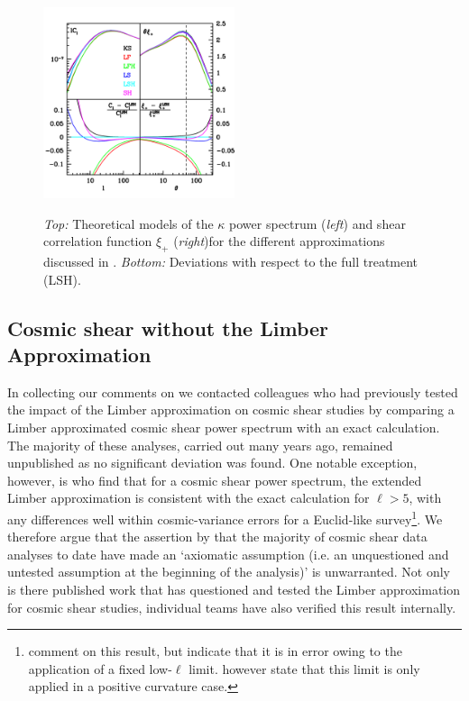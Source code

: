  \begin{figure}
 \begin{center}
 \includegraphics[width=0.5\textwidth]{figures/Cl_xi_comp.pdf}
 \label{fig:Cl_xi}
 \caption{\emph{Top:} Theoretical models of the $\kappa$ power spectrum (\emph{left}) and shear correlation function $\xi_+$ (\emph{right})for the different approximations discussed in \citet{kitching/etal:2016}. \emph{Bottom:} Deviations with respect to the full treatment (LSH). }
 \end{center}
 \end{figure}
 
 \subsection{Cosmic shear without the Limber Approximation}
In collecting our comments on \citet{kitching/etal:2016} we contacted colleagues who had previously tested the impact of the Limber approximation on cosmic shear studies by comparing a Limber approximated cosmic shear power spectrum with an exact calculation.  The majority of these analyses, carried out many years ago, remained unpublished as no significant deviation was found.  One notable exception, however, is \citet{giannantonio/etal:2012} who find that for a cosmic shear power spectrum, the extended Limber approximation is consistent with the exact calculation for $\ell>5$, with any differences well within cosmic-variance errors for a Euclid-like survey\footnote{\citet{kitching/etal:2016} comment on this result, but indicate that it is in error owing to the application of a fixed low-$\ell$ limit.  \citet{giannantonio/etal:2012} however state that this limit is only applied in a positive curvature case.}.  We therefore argue that the assertion by \citet{kitching/etal:2016} that the majority of cosmic shear data analyses to date have made an `axiomatic assumption (i.e. an unquestioned and untested assumption at the beginning of the analysis)'  is unwarranted.  Not only is there published work that has questioned and tested the Limber approximation for cosmic shear studies, individual teams have also verified this result internally.    

